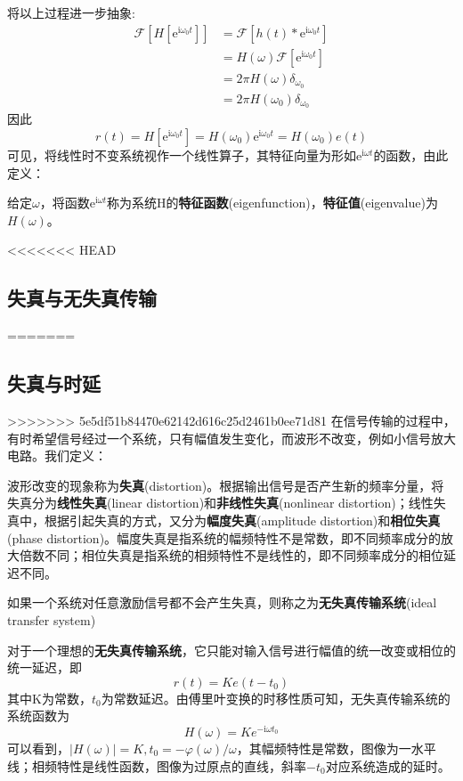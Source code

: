 将以上过程进一步抽象:
\begin{align*}
    \mathcal{F}\left[H[\mathrm{e}^{\mathrm{i}\omega_0 t}]\right]&=\mathcal{F} \left[h(t)*\mathrm{e}^{\mathrm{i}\omega_0 t}\right]\\
    &=H(\omega)\mathcal{F} \left[\mathrm{e}^{\mathrm{i}\omega_0 t}\right]\\
    &=2\pi H(\omega)\delta_{\omega_0}\\
    &=2\pi H(\omega_0)\delta_{\omega_0}
\end{align*}
因此\[r(t)=H\left[\mathrm{e}^{\mathrm{i}\omega_0 t}\right]=H(\omega_0)\mathrm{e}^{\mathrm{i}\omega_0 t}=H(\omega_0)e(t)\]
可见，将线性时不变系统视作一个线性算子，其特征向量为形如$\mathrm{e}^{\mathrm{i}\omega t}$的函数，由此定义：
\begin{definition}[特征函数]
    给定$\omega$，将函数$\mathrm{e}^{\mathrm{i}\omega t}$称为系统H的\textbf{特征函数}(eigenfunction)，\textbf{特征值}(eigenvalue)为$H(\omega)$。
\end{definition}

<<<<<<< HEAD
\subsection{失真与无失真传输}\label{sub:distortion}
=======
\subsection{失真与时延}\label{sub:distortion}

>>>>>>> 5e5df51b84470e62142d616c25d2461b0ee71d81
在信号传输的过程中，有时希望信号经过一个系统，只有幅值发生变化，而波形不改变，例如小信号放大电路。我们定义：
\begin{definition}[失真]
波形改变的现象称为\textbf{失真}(distortion)。根据输出信号是否产生新的频率分量，将失真分为\textbf{线性失真}(linear distortion)和\textbf{非线性失真}(nonlinear distortion)；线性失真中，根据引起失真的方式，又分为\textbf{幅度失真}(amplitude distortion)和\textbf{相位失真}(phase distortion)。幅度失真是指系统的幅频特性不是常数，即不同频率成分的放大倍数不同；相位失真是指系统的相频特性不是线性的，即不同频率成分的相位延迟不同。
\end{definition}
\begin{definition}[无失真传输系统]
如果一个系统对任意激励信号都不会产生失真，则称之为\textbf{无失真传输系统}(ideal transfer system)
\end{definition}

对于一个理想的\textbf{无失真传输系统}，它只能对输入信号进行幅值的统一改变或相位的统一延迟，即\[r(t)=Ke(t-t_0)\]其中K为常数，$t_0$为常数延迟。由傅里叶变换的时移性质可知，无失真传输系统的系统函数为
\[H(\omega) = Ke^{-\mathrm{i}\omega t_0}\]
可以看到，$|H(\omega)|=K,t_0=-\varphi(\omega)/\omega$，其幅频特性是常数，图像为一水平线；相频特性是线性函数，图像为过原点的直线，斜率$-t_0$对应系统造成的延时。


